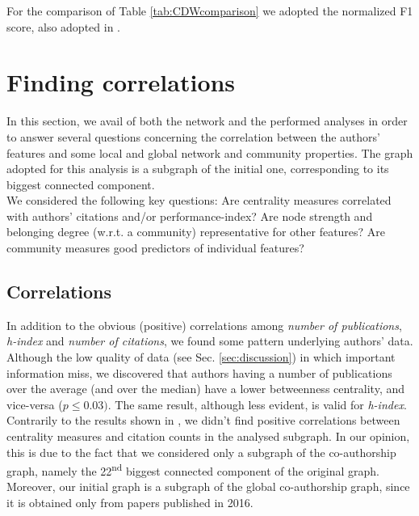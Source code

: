 \documentclass[sigchi]{acmart}
\begin{document}
For the comparison of Table \ref{tab:CDWcomparison} we adopted the normalized F1 score, also adopted in \cite{f1}.

\section{Finding correlations} \label{sec:openQuestion}
In this section, we avail of both the network and the performed analyses in order to answer several questions concerning the correlation between the authors' features and some local and global network and community properties. 
The graph adopted for this analysis is a subgraph of the initial one, corresponding to its biggest connected component. \\
We considered the following key questions: Are centrality measures correlated with authors' citations and/or performance-index? Are node strength and belonging degree (w.r.t. a community) representative for other features?
Are community measures good predictors of individual features? 

\subsection{Correlations} 
In addition to the obvious (positive) correlations among \textit{number of publications}, \textit{h-index} and \textit{number of citations}, we found some pattern underlying authors' data. Although the low quality of data (see Sec. \ref{sec:discussion}) in which important information miss, we discovered that authors having a number of publications over the average (and over the median) have a lower betweenness centrality, and vice-versa ($p \le 0.03)$. The same result, although less evident, is valid for \textit{h-index}. \\
Contrarily to the results shown in \cite{centralities}, we didn't find positive correlations between centrality measures and citation counts in the analysed subgraph. In our opinion, this is due to the fact that we considered only a subgraph of the co-authorship graph, namely the 22\textsuperscript{nd} biggest connected component of the original graph. Moreover, our initial graph is a subgraph of the global co-authorship graph, since it is obtained only from papers published in 2016.
\end{document}

